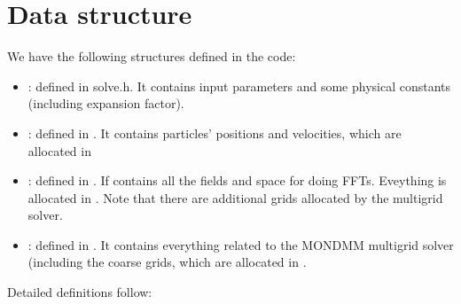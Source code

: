 \documentclass[letterpaper,10pt,english]{sphinxmanual}
\begin{document}
\chapter{Data structure}
\label{\detokenize{data_structure:data-structure}}\label{\detokenize{data_structure::doc}}
We have the following structures defined in the code:
\begin{itemize}
\item {} 
: defined in solve.h.  It contains input parameters and some physical constants (including expansion factor).

\item {} 
: defined in .  It contains particles’ positions and velocities, which are allocated in 

\item {} 
: defined in .  If contains all the fields and space for doing FFTs.  Eveything is allocated in .  Note that there are additional grids allocated by the multigrid solver.

\item {} 
: defined in .  It contains everything related to the MOND\sphinxhyphen{}MM multigrid solver (including the coarse grids, which are allocated in .

\end{itemize}

Detailed definitions follow:
\end{document}

